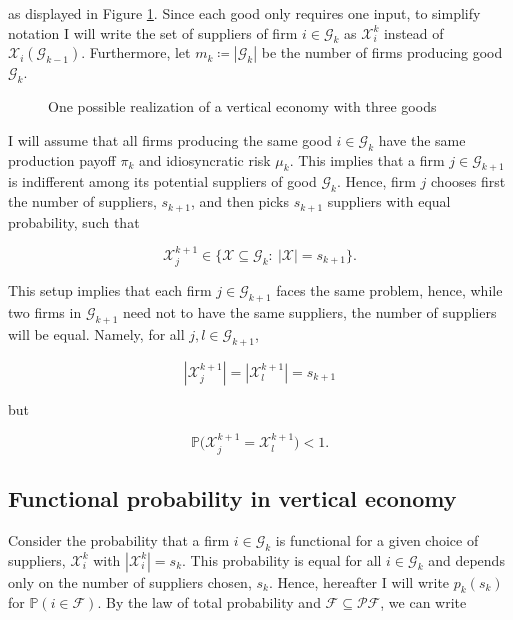 \documentclass[american, abstract=on]{scrartcl}
\newcommand{\inputTikZ}[2]{%
      \scalebox{#1}{}  
    }
\newcommand{\F}{\mathcal{F}}
\newcommand{\X}{\mathcal{X}}
\newcommand{\G}{\mathcal{G}}
\newcommand{\PF}{\mathcal{P} \F}
\renewcommand{\P}{\mathbb{P}}
\newcommand{\abs}[1]{\left\lvert#1\right\rvert}
\begin{document}
as displayed in Figure \ref{fig:vertical}. Since each good only requires one input, to simplify notation I will write the set of suppliers of firm $i \in \G_k$ as $\X^k_i$ instead of $\X_i(\G_{k - 1})$. Furthermore, let $m_k \coloneqq \abs{\G_k}$ be the number of firms producing good $\G_k$.

\begin{figure}[H]
  \centering
  \inputTikZ{0.7}{diagrams/vertical-economy.tikz} 
  \caption{One possible realization of a vertical economy with three goods}
  \label{fig:vertical}
\end{figure}



I will assume that all firms producing the same good $i \in \G_k$ have the same production payoff $\pi_k$ and idiosyncratic risk $\mu_k$. This implies that a firm $j \in \G_{k+1}$ is indifferent among its potential suppliers of good $\G_k$. Hence, firm $j$ chooses first the number of suppliers, $s_{k+1}$, and then picks $s_{k+1}$ suppliers with equal probability, such that

\begin{equation}
  \X^{k+1}_j \in \{ \X \subseteq \G_{k}: \ \abs{\X} = s_{k+1} \}.
\end{equation}


This setup implies that each firm $j \in \G_{k+1}$ faces the same problem, hence, while two firms in $\G_{k+1}$ need not to have the same suppliers, the number of suppliers will be equal. Namely, for all $j, l \in \G_{k+1}$,

\begin{equation}
  \abs{\X^{k+1}_j} = \abs{\X^{k+1}_l} = s_{k+1}
\end{equation}

but

\begin{equation}
  \P\Big(\X^{k+1}_j = \X^{k+1}_l\Big) < 1.
\end{equation}

\subsection{Functional probability in vertical economy}

Consider the probability that a firm $i \in \G_k$ is functional for a given choice of suppliers, $\X^k_i$ with $\abs{\X^k_i} = s_k$. This probability is equal for all $i \in \G_k$ and depends only on the number of suppliers chosen, $s_k$. Hence, hereafter I will write $p_k(s_k)$ for $\P(i \in \F)$. By the law of total probability and $\F \subseteq \PF$, we can write
\end{document}
